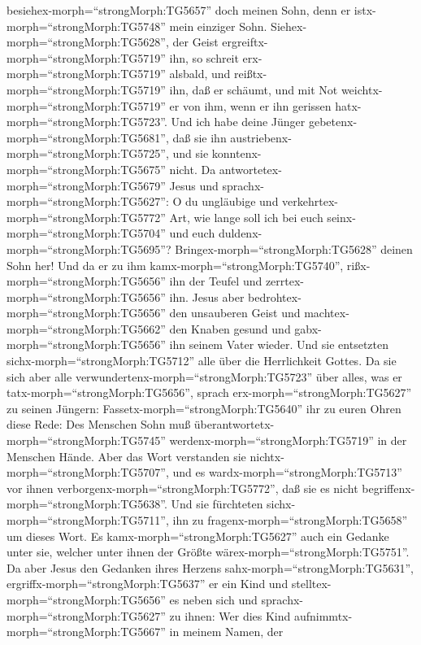 besiehex-morph=``strongMorph:TG5657'' doch meinen Sohn, denn er
istx-morph=``strongMorph:TG5748'' mein einziger Sohn. 
Siehex-morph=``strongMorph:TG5628'', der Geist
ergreiftx-morph=``strongMorph:TG5719'' ihn, so schreit
erx-morph=``strongMorph:TG5719'' alsbald, und
reißtx-morph=``strongMorph:TG5719'' ihn, daß er schäumt, und mit Not
weichtx-morph=``strongMorph:TG5719'' er von ihm, wenn er ihn gerissen
hatx-morph=``strongMorph:TG5723''.  Und ich habe deine
Jünger gebetenx-morph=``strongMorph:TG5681'', daß sie ihn
austriebenx-morph=``strongMorph:TG5725'', und sie
konntenx-morph=``strongMorph:TG5675'' nicht.  Da
antwortetex-morph=``strongMorph:TG5679'' Jesus und
sprachx-morph=``strongMorph:TG5627'': O du ungläubige und
verkehrtex-morph=``strongMorph:TG5772'' Art, wie lange soll ich bei euch
seinx-morph=``strongMorph:TG5704'' und euch
duldenx-morph=``strongMorph:TG5695''?
Bringex-morph=``strongMorph:TG5628'' deinen Sohn her!  Und
da er zu ihm kamx-morph=``strongMorph:TG5740'',
rißx-morph=``strongMorph:TG5656'' ihn der Teufel und
zerrtex-morph=``strongMorph:TG5656'' ihn. Jesus aber
bedrohtex-morph=``strongMorph:TG5656'' den unsauberen Geist und
machtex-morph=``strongMorph:TG5662'' den Knaben gesund und
gabx-morph=``strongMorph:TG5656'' ihn seinem Vater wieder. 
Und sie entsetzten sichx-morph=``strongMorph:TG5712'' alle über die
Herrlichkeit Gottes. Da sie sich aber alle
verwundertenx-morph=``strongMorph:TG5723'' über alles, was er
tatx-morph=``strongMorph:TG5656'', sprach
erx-morph=``strongMorph:TG5627'' zu seinen Jüngern: 
Fassetx-morph=``strongMorph:TG5640'' ihr zu euren Ohren diese Rede: Des
Menschen Sohn muß überantwortetx-morph=``strongMorph:TG5745''
werdenx-morph=``strongMorph:TG5719'' in der Menschen Hände.
 Aber das Wort verstanden sie
nichtx-morph=``strongMorph:TG5707'', und es
wardx-morph=``strongMorph:TG5713'' vor ihnen
verborgenx-morph=``strongMorph:TG5772'', daß sie es nicht
begriffenx-morph=``strongMorph:TG5638''. Und sie fürchteten
sichx-morph=``strongMorph:TG5711'', ihn zu
fragenx-morph=``strongMorph:TG5658'' um dieses Wort.  Es
kamx-morph=``strongMorph:TG5627'' auch ein Gedanke unter sie, welcher
unter ihnen der Größte wärex-morph=``strongMorph:TG5751''. 
Da aber Jesus den Gedanken ihres Herzens
sahx-morph=``strongMorph:TG5631'', ergriffx-morph=``strongMorph:TG5637''
er ein Kind und stelltex-morph=``strongMorph:TG5656'' es neben sich
 und sprachx-morph=``strongMorph:TG5627'' zu ihnen: Wer
dies Kind aufnimmtx-morph=``strongMorph:TG5667'' in meinem Namen, der
